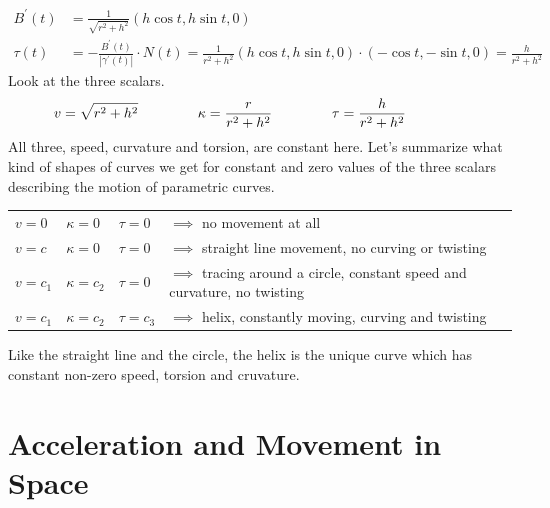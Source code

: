 \documentclass[fleqn,letterpaper]{report}
\begin{document}
\begin{example}
\begin{align*}
B^\prime(t) & = \frac{1}{\sqrt{r^2 + h^2}} (h \cos t, h \sin t,
0) \\
\tau(t) & = - \frac{B^\prime(t)}{|\gamma^\prime(t)|} \cdot N(t)
= \frac{1}{r^2 + h^2} (h \cos t, h \sin t , 0 ) \cdot (-\cos t,
- \sin t, 0) = \frac{h}{r^2 + h^2}
\end{align*}
Look at the three scalars. 
\begin{equation*}
v = \sqrt{r^2 + h^2} \hspace{1.5cm}
\kappa = \frac{r}{r^2 + h^2} \hspace{1.5cm} 
\tau = \frac{h}{r^2 + h^2} \hspace{1.5cm} 
\end{equation*}
All three, speed, curvature and torsion, are constant here.
Let's summarize what kind of shapes of curves we get for
constant and zero values of the three scalars describing the
motion of parametric curves. 
\begin{tabular}{llll}
$v = 0$ & $\kappa = 0$ & $\tau = 0$ & $\implies$ no movement
at all \\
$v = c$ & $\kappa = 0$ & $\tau = 0$ & $\implies$ straight line
movement, no curving or twisting \\
$v = c_1$ & $\kappa = c_2$ & $\tau = 0$ & $\implies$ tracing
around a circle, constant speed and curvature, no twisting \\
$v = c_1$ & $\kappa = c_2$ & $\tau = c_3$ & $\implies$ helix,
constantly moving, curving and twisting
\end{tabular}

Like the straight line and the circle, the helix is the unique
curve which has constant non-zero speed, torsion and
cruvature. 
\end{example}

\section{Acceleration and Movement in Space}
\label{acceleration}
\end{document}
